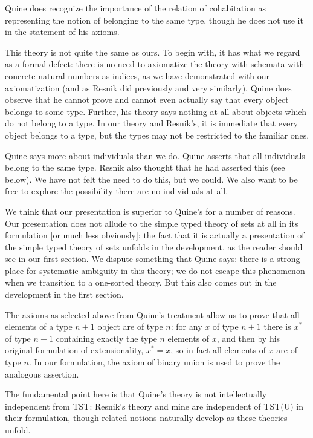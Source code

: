 \documentclass[12pt]{article}
\begin{document}
Quine does recognize the importance of the relation of cohabitation as representing the notion of belonging to the same type, though he does not use it in the statement of his axioms.

This theory is not quite the same as ours.  To begin with, it has what we regard as a formal defect:  there is no need to axiomatize the theory with schemata with concrete natural numbers as indices, as we have demonstrated with our axiomatization (and as Resnik did previously and very similarly).  Quine does observe that he cannot prove and cannot even actually say that every object belongs to some type.  Further, his theory says nothing at all about objects which do not belong to a type. In our theory and Resnik's, it is immediate that every object belongs to a type, but the types may not be restricted to the familiar ones.

Quine says more about individuals than we do.  Quine asserts that all individuals belong to the same type.  Resnik also thought that he had asserted this (see below).  We have not felt the need to do this, but we could.  We also want to be free to explore the possibility there are no individuals at all.

We think that our presentation is superior to Quine's for a number of reasons.  Our presentation does not allude to the simple typed theory of sets at all in its formulation [or much less obviously]:  the fact that it is actually a presentation of the simple typed theory of sets unfolds in the development, as the reader should see in our first section.  We dispute something that Quine says:  there is a strong place for systematic ambiguity in this theory; we do not escape this phenomenon when we transition to a one-sorted theory.  But this also comes out in the development in the first section.

The axioms as selected above from Quine's treatment allow us to prove that
all elements of a type $n+1$ object are of type $n$:  for any $x$ of type $n+1$ there
is $x^*$ of type $n+1$ containing exactly the type $n$ elements of $x$, and then by his original formulation of extensionality, $x^*=x$, so in fact all elements of $x$ are of type $n$.  In our formulation, the axiom of binary union is used to prove the analogous assertion.

The fundamental point here is that Quine's theory is not intellectually independent from TST:  Resnik's theory and mine are independent of TST(U) in their formulation, though related notions naturally develop as these theories unfold.
\end{document}
